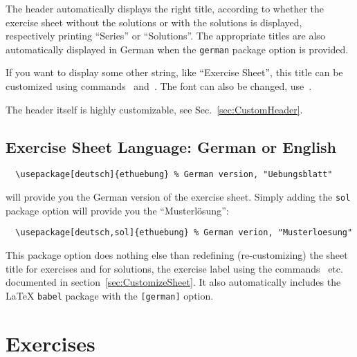 \documentclass[11pt,a4paper]{article}
\begin{document}
The header automatically displays the right title, according to whether the exercise sheet
without the solutions or with the solutions is displayed, respectively printing ``Series''
or ``Solutions''. The appropriate titles are also automatically displayed in German when
the \texttt{german} package option is provided.

\begin{pkgtip}
  If you want to display some other string,
  like ``Exercise Sheet'', this title can be customized using
  commands~ and~. The
  font can also be changed, use~.

  The header itself is highly customizable, see Sec.~\ref{sec:CustomHeader}.
\end{pkgtip}


\subsection{Exercise Sheet Language: German or English}
\label{sec:Language}

\begin{pkgverbatim}
\begin{verbatim}
  \usepackage[deutsch]{ethuebung} % German version, "Uebungsblatt"
\end{verbatim}
\end{pkgverbatim}
will provide you the German version of the exercise sheet. Simply adding the \texttt{sol}
package option will provide you the ``Musterl\"osung'':
\begin{pkgverbatim}
\begin{verbatim}
  \usepackage[deutsch,sol]{ethuebung} % German verion, "Musterloesung"
\end{verbatim}
\end{pkgverbatim}

\begin{pkgtip}
  This package option does nothing else than redefining (re-customizing) the sheet title
  for exercises and for solutions, the exercise label using the
  commands~ etc. documented in
  section~\ref{sec:CustomizeSheet}. It also automatically includes the \LaTeX{}
  \texttt{babel} package with the \texttt{[german]} option.
\end{pkgtip}




\section{Exercises}
\end{document}
